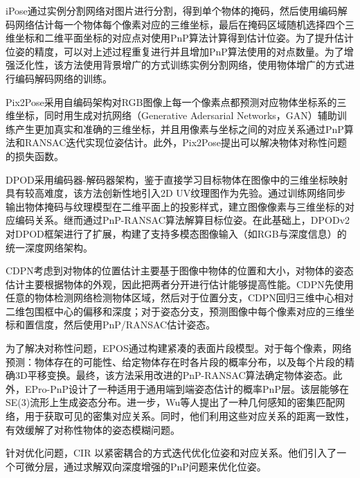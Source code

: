 \par iPose\cite{hosseini2019ipose}通过实例分割网络对图片进行分割，得到单个物体的掩码，然后使用编码解码网络估计每一个物体每个像素对应的三维坐标，最后在掩码区域随机选择四个三维坐标和二维平面坐标的对应点对使用PnP算法计算得到估计位姿。为了提升估计位姿的精度，可以对上述过程重复进行并且增加PnP算法使用的对点数量。为了增强泛化性，该方法使用背景增广的方式训练实例分割网络，使用物体增广的方式进行编码解码网络的训练。

\par Pix2Pose\cite{park2019pix2pose}采用自编码架构对RGB图像上每一个像素点都预测对应物体坐标系的三维坐标，同时用生成对抗网络（Generative Adersarial Networks，GAN）辅助训练产生更加真实和准确的三维坐标，并且用像素与坐标之间的对应关系通过PnP算法和RANSAC迭代实现位姿估计。此外，Pix2Pose提出可以解决物体对称性问题的损失函数。

\par DPOD\cite{zakharov2019dpod}采用编码器-解码器架构，鉴于直接学习目标物体在图像中的三维坐标映射具有较高难度，该方法创新性地引入2D UV纹理图作为先验。通过训练网络同步输出物体掩码与纹理模型在二维平面上的投影样式，建立图像像素与三维坐标的对应编码关系。继而通过PnP-RANSAC算法解算目标位姿。在此基础上，DPODv2\cite{Shugurov2021DPODv2}对DPOD框架\cite{zakharov2019dpod}进行了扩展，构建了支持多模态图像输入（如RGB与深度信息）的统一深度网络架构。

\par CDPN\cite{li2019cdpn}考虑到对物体的位置估计主要基于图像中物体的位置和大小，对物体的姿态估计主要根据物体的外观，因此把两者分开进行估计能够提高性能。CDPN先使用任意的物体检测网络检测物体区域，然后对于位置分支，CDPN回归三维中心相对二维包围框中心的偏移和深度；对于姿态分支，预测图像中每个像素对应的三维坐标和置信度，然后使用PnP/RANSAC\cite{RANSAC}估计姿态。

\par 为了解决对称性问题，EPOS\cite{hodan2020epos}通过构建紧凑的表面片段模型。对于每个像素，网络预测：物体存在的可能性、给定物体存在时各片段的概率分布，以及每个片段的精确3D平移变换。最终，该方法采用改进的PnP-RANSAC算法\cite{RANSAC}确定物体姿态。此外，EPro-PnP\cite{Chen2022EPro_PnP}设计了一种适用于通用端到端姿态估计的概率PnP层。该层能够在SE(3)流形上生成姿态分布。进一步，Wu等人\cite{wu2023geometric}提出了一种几何感知的密集匹配网络，用于获取可见的密集对应关系。同时，他们利用这些对应关系的距离一致性，有效缓解了对称性物体的姿态模糊问题。

\par 针对优化问题，CIR\cite{lipson2022coupled} 以紧密耦合的方式迭代优化位姿和对应关系。他们引入了一个可微分层，通过求解双向深度增强的PnP问题来优化位姿。

